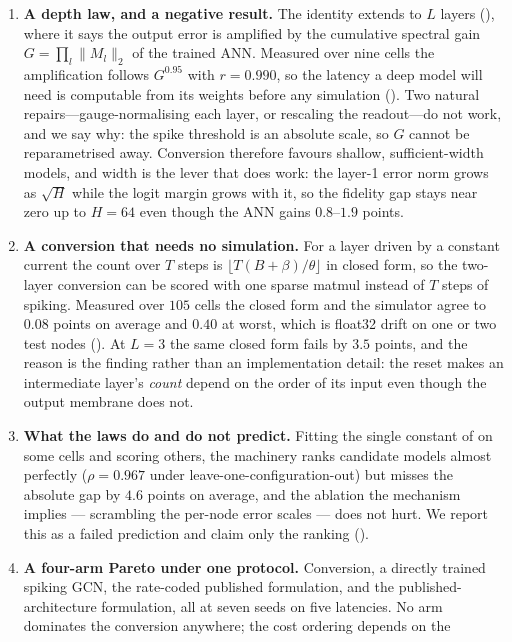 \begin{enumerate}
with a theory-versus-simulation gap of exactly zero, together with a quantitative account of where
the bound is loose ().
\item \textbf{A depth law, and a negative result.} The identity extends to $L$ layers
(), where it says the output error is amplified by the cumulative spectral gain
$G=\prod_l\lVert M_l\rVert_{2}$ of the trained ANN. Measured over nine cells the amplification follows
$G^{0.95}$ with $r=0.990$, so the latency a deep model will need is computable from its weights
before any simulation (). Two natural repairs---gauge-normalising each layer, or
rescaling the readout---do not work, and we say why: the spike threshold is an absolute scale, so
$G$ cannot be reparametrised away. Conversion therefore favours shallow, sufficient-width models,
and width is the lever that does work: the layer-1 error norm grows as $\sqrt{H}$ while the logit
margin grows with it, so the fidelity gap stays near zero up to $H=64$ even though the ANN gains
$0.8$--$1.9$ points.
\item \textbf{A conversion that needs no simulation.} For a layer driven by a constant current the
count over $T$ steps is $\lfloor T(B+\beta)/\theta\rfloor$ in closed form, so the two-layer
conversion can be scored with one sparse matmul instead of $T$ steps of spiking. Measured over $105$
cells the closed form and the simulator agree to $0.08$ points on average and $0.40$ at worst, which
is float32 drift on one or two test nodes (). At $L=3$ the same closed form fails
by $3.5$ points, and the reason is the finding rather than an implementation detail: the reset makes
an intermediate layer's \emph{count} depend on the order of its input even though the output
membrane does not.
\item \textbf{What the laws do and do not predict.} Fitting the single constant of
 on some cells and scoring others, the machinery ranks candidate models almost
perfectly ($\rho=0.967$ under leave-one-configuration-out) but misses the absolute gap by $4.6$
points on average, and the ablation the mechanism implies --- scrambling the per-node error scales
--- does not hurt. We report this as a failed prediction and claim only the ranking
().
\item \textbf{A four-arm Pareto under one protocol.} Conversion, a directly trained spiking GCN, the
rate-coded published formulation, and the published-architecture formulation, all at seven seeds on
five latencies. No arm dominates the conversion anywhere; the cost ordering depends on the

\end{enumerate}
